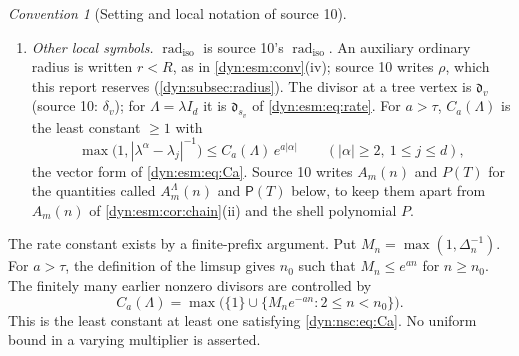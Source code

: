 \documentclass[11pt,letterpaper]{article}
\theoremstyle{definition}
\theoremstyle{remark}
\newtheorem{convention}[convention]{Convention}
\newcommand{\radiso}{\operatorname{rad}_{\mathrm{iso}}}
\numberwithin{equation}{section}
\begin{document}
\begin{convention}[Setting and local notation of source 10]
\begin{enumerate}[label=(\roman*)]
$H\circ F=\Lambda H$. Source 10 computes the forward coordinate first. It
writes $G=z+g$ with $F\circ G=G\circ\Lambda$; this is our
$\check H=H^{-1}=z+\check h$ of \cref{dyn:esm:conv}(iii). Its $H$ is ours.
Every formula below has been translated.
\item \emph{Other local symbols.} $\radiso$ is source 10's
$\operatorname{rad}_{\mathrm{iso}}$. An auxiliary ordinary radius is written
$r<R$, as in \cref{dyn:esm:conv}(iv); source 10 writes $\rho$, which this
report reserves (\cref{dyn:subsec:radius}). The divisor at a tree vertex is
$\mathfrak d_v$ (source 10: $\delta_v$); for $\Lambda=\lambda I_d$ it is
$\mathfrak d_{s_v}$ of \eqref{dyn:esm:eq:rate}. For $a>\tau$, $C_a(\Lambda)$
is the least constant $\ge1$ with
\begin{equation}\label{dyn:nsc:eq:Ca}
 \max\bigl(1,|\lambda^{\alpha}-\lambda_j|^{-1}\bigr)\le C_a(\Lambda)\,e^{a|\alpha|}
 \qquad(|\alpha|\ge2,\ 1\le j\le d),
\end{equation}
the vector form of \eqref{dyn:esm:eq:Ca}. Source 10 writes $A_m(n)$ and
$P(T)$ for the quantities called $A^{\Lambda}_m(n)$ and $\mathsf P(T)$ below,
to keep them apart from $A_m(n)$ of \cref{dyn:esm:cor:chain}(ii) and the
shell polynomial $P$.
\end{enumerate}
\end{convention}

The rate constant exists by a finite-prefix argument. Put
$M_n=\max(1,\Delta_n^{-1})$. For $a>\tau$, the definition of the
limsup gives $n_0$ such that $M_n\le e^{an}$ for $n\ge n_0$.
The finitely many earlier nonzero divisors are controlled by
\[
 C_a(\Lambda)=\max\bigl(\{1\}\cup
       \{M_ne^{-an}:2\le n<n_0\}\bigr).
\]
This is the least constant at least one satisfying \eqref{dyn:nsc:eq:Ca}.
No uniform bound in a varying multiplier is asserted.
\end{document}
